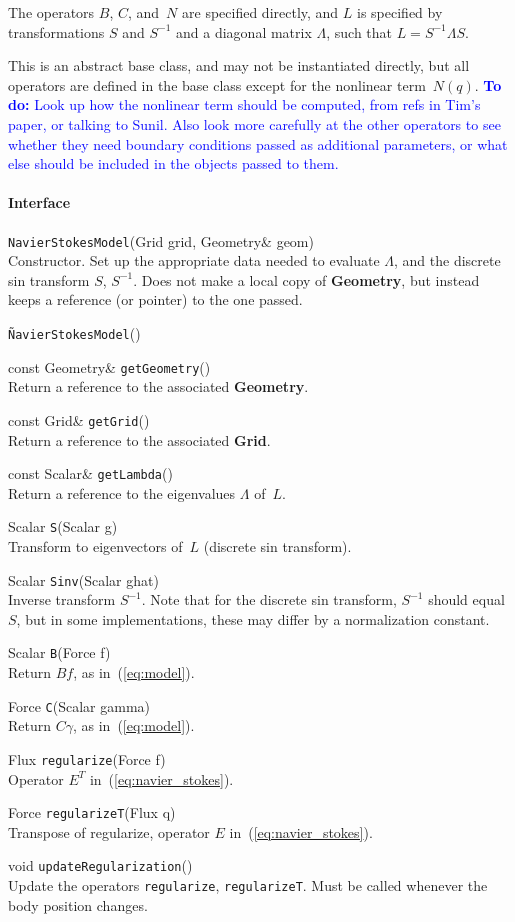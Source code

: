 \documentclass[11pt]{article}
\def\todo#1{\textcolor{blue}{{\bf To do:} #1}}
\def\class#1{{\bf #1}} %
\def\fn#1{{\tt #1}} %
\begin{document}
The operators $B$, $C$, and~$N$ are specified directly, and $L$ is specified by transformations $S$ and $S^{-1}$ and a diagonal matrix $\Lambda$, such that $L=S^{-1}\Lambda S$.

This is an abstract base class, and may not be instantiated directly, but all operators are defined in the base class except for the nonlinear term~$N(q)$.  \todo{Look up how the nonlinear term should be computed, from refs in Tim's paper, or talking to Sunil.  Also look more carefully at the other operators to see whether they need boundary conditions passed as additional parameters, or what else should be included in the objects passed to them.}

\paragraph{Interface}
\begin{description}
	\item \fn{NavierStokesModel}(Grid grid, Geometry\& geom)\\
		Constructor.  Set up the appropriate data needed to evaluate $\Lambda$, and the discrete sin transform $S$, $S^{-1}$.  Does not make a local copy of \class{Geometry}, but instead keeps a reference (or pointer) to the one passed.
	\item \fn{\~NavierStokesModel}()\\
	\item const Geometry\& \fn{getGeometry}()\\
		Return a reference to the associated \class{Geometry}.
	\item const Grid\& \fn{getGrid}()\\
		Return a reference to the associated \class{Grid}.
	\item const Scalar\& \fn{getLambda}()\\
		Return a reference to the eigenvalues $\Lambda$ of~$L$.
	\item Scalar \fn{S}(Scalar g)\\
		Transform to eigenvectors of~$L$ (discrete sin transform).
	\item Scalar \fn{Sinv}(Scalar ghat)\\
		Inverse transform $S^{-1}$.  Note that for the discrete sin transform, $S^{-1}$ should equal~$S$, but in some implementations, these may differ by a normalization constant.
	\item Scalar \fn{B}(Force f)\\
		Return $Bf$, as in~(\ref{eq:model}).
	\item Force \fn{C}(Scalar gamma)\\
		Return $C\gamma$, as in~(\ref{eq:model}).
	\item Flux \fn{regularize}(Force f) \\
		Operator $E^T$ in~(\ref{eq:navier_stokes}).
	\item Force \fn{regularizeT}(Flux q) \\
		Transpose of regularize, operator $E$ in~(\ref{eq:navier_stokes}).
	\item void \fn{updateRegularization}() \\
		Update the operators \fn{regularize}, \fn{regularizeT}.  Must be called whenever the body position changes.
\end{description}
\end{document}
